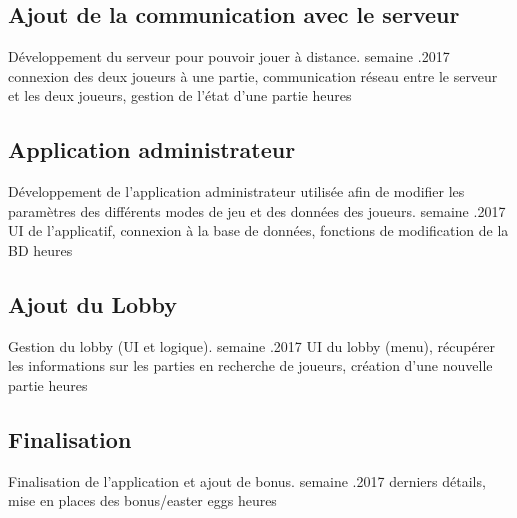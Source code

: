 \documentclass[a4paper,11pt]{article}
\begin{document}
		\subsection{Ajout de la communication avec le serveur}
		\begin{enumerate}[labelwidth=5em,leftmargin=8em]
			\objectif Développement du serveur pour pouvoir jouer à distance.
			 semaine
			.2017
			\partageTache connexion des deux joueurs à une partie, communication réseau entre le serveur et les deux joueurs, gestion de l'état d'une partie
			 heures
		\end{enumerate}
		\subsection{Application administrateur}
		\begin{enumerate}[labelwidth=5em,leftmargin=8em]
			\objectif Développement de l'application administrateur utilisée afin de modifier les paramètres des différents modes de jeu et des données des joueurs.
			 semaine
			.2017
			\partageTache UI de l'applicatif, connexion à la base de données, fonctions de modification de la BD
			 heures
		\end{enumerate}
		\subsection{Ajout du Lobby}
		\begin{enumerate}[labelwidth=5em,leftmargin=8em]
			\objectif Gestion du lobby (UI et logique).
			 semaine
			.2017
			\partageTache UI du lobby (menu), récupérer les informations sur les parties en recherche de joueurs, création d'une nouvelle partie
			 heures
		\end{enumerate}
		\subsection{Finalisation}
		\begin{enumerate}[labelwidth=5em,leftmargin=8em]
			\objectif Finalisation de l'application et ajout de bonus.
			 semaine
			.2017
			\partageTache derniers détails, mise en places des bonus/easter eggs
			 heures
		\end{enumerate}
\end{document}
